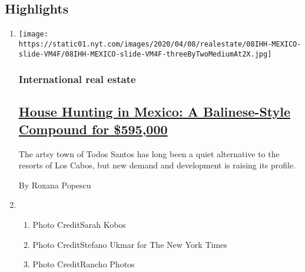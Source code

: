 \hypertarget{highlights}{%
\subsection{Highlights}\label{highlights}}

\begin{enumerate}
\def\labelenumi{\arabic{enumi}.}
\item
  \texttt{[image: https://static01.nyt.com/images/2020/04/08/realestate/08IHH-MEXICO-slide-VM4F/08IHH-MEXICO-slide-VM4F-threeByTwoMediumAt2X.jpg]}

  \hypertarget{international-real-estate}{%
  \subsubsection{International real
  estate}\label{international-real-estate}}

  \hypertarget{house-hunting-in-mexico-a-balinese-style-compound-for-595000}{%
  \subsection{\texorpdfstring{\href{/2020/04/08/realestate/house-hunting-in-mexico-a-balinese-style-compound-for-595000.html}{House
  Hunting in Mexico: A Balinese-Style Compound for
  \$595,000}}{House Hunting in Mexico: A Balinese-Style Compound for \$595,000}}\label{house-hunting-in-mexico-a-balinese-style-compound-for-595000}}

  The artsy town of Todos Santos has long been a quiet alternative to
  the resorts of Los Cabos, but new demand and development is raising
  its profile.

  By Roxana Popescu
\item
  \begin{enumerate}
  \def\labelenumii{\arabic{enumii}.}
  \tightlist
  \item
    Photo CreditSarah Kobos
  \item
    Photo CreditStefano Ukmar for The New York Times
  \item
    Photo CreditRancho Photos
  \end{enumerate}
\end{enumerate}


